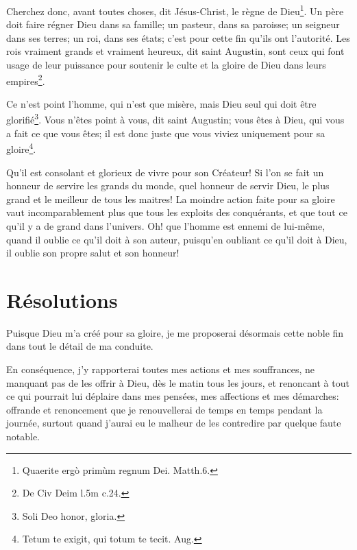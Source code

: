 \documentclass[instructions.tex]{subfiles}
\begin{document}
Cherchez donc, avant toutes choses, dit Jésus-Christ, le règne de Dieu\footnote{Quaerite ergò primùm regnum Dei. Matth.6.}. Un père doit faire régner Dieu dans sa famille; un pasteur, dans sa paroisse; un seigneur dans ses terres; un roi, dans ses états; c'est pour cette fin qu'ils ont l'autorité. Les rois vraiment grands et vraiment heureux, dit saint Augustin, sont ceux qui font usage de leur puissance pour soutenir le culte et la gloire de Dieu dans leurs empires\footnote{De Civ Deim l.5m c.24.}. 

Ce n'est point l'homme, qui n'est que misère, mais Dieu seul qui doit être glorifié\footnote{Soli Deo honor, gloria.}. Vous n'êtes point à vous, dit saint Augustin; vous êtes à Dieu, qui vous a fait ce que vous êtes; il est donc juste que vous viviez uniquement pour sa gloire\footnote{Tetum te exigit, qui totum te tecit. Aug.}. 

Qu'il est consolant et glorieux de vivre pour son Créateur! Si l'on se fait un honneur de servire les grands du monde, quel honneur de servir Dieu, le plus grand et le meilleur de tous les maitres! La moindre action faite pour sa gloire vaut incomparablement plus que tous les exploits des conquérants, et que tout ce qu'il y a de grand dans l'univers. Oh! que l'homme est ennemi de lui-même, quand il oublie ce qu'il doit à son auteur, puisqu'en oubliant ce qu'il doit à Dieu, il oublie son propre salut et son honneur!

\section{Résolutions}

\primo Puisque Dieu m'a créé pour sa gloire, je me proposerai désormais cette noble fin dans tout le détail de ma conduite. 

\secundo En conséquence, j'y rapporterai toutes mes actions et mes souffrances, ne manquant pas de les offrir à Dieu, dès le matin tous les jours, et renoncant à tout ce qui pourrait lui déplaire dans mes pensées, mes affections et mes démarches: offrande et renoncement que je renouvellerai de temps en temps pendant la journée, surtout quand j'aurai eu le malheur de les contredire par quelque faute notable. 

\end{document}
